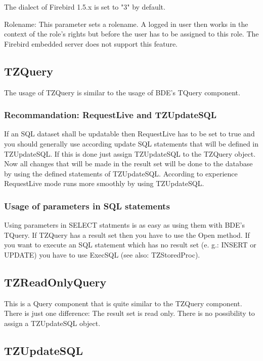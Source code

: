 \documentclass[a4paper,12pt,oneside]{book}
\begin{document}
The dialect of Firebird 1.5.x is set to "3" by default.

Rolename:
This parameter sets a rolename. A logged in user then works in the context of the role's rights but before the user has to be assigned to this role.
The Firebird embedded server does not support this feature.

\subsection{TZQuery}

The usage of TZQuery is similar to the usage of BDE's TQuery component.

\subsubsection{Recommandation: RequestLive and TZUpdateSQL}
If an SQL dataset shall be updatable then RequestLive has to be set to true and you should generally use according update SQL statements that will be defined in TZUpdateSQL.
If this is done just assign TZUpdateSQL to the TZQuery object.
Now all changes that will be made in the result set will be done to the database by using the defined statements of TZUpdateSQL.
According to experience RequestLive mode runs more smoothly by using TZUpdateSQL.

\subsubsection{Usage of parameters in SQL statements}

Using parameters in SELECT statments is as easy as using them with BDE's TQuery.
If TZQuery has a result set then you have to use the Open method.
If you want to execute an SQL statement which has no result set (e. g.: INSERT or UPDATE) you have to use ExecSQL (see also: TZStoredProc).

\subsection{TZReadOnlyQuery}

This is a Query component that is quite similar to the TZQuery component.
There is just one difference:
The result set is read only.
There is no possibility to assign a TZUpdateSQL object.

\subsection{TZUpdateSQL}
\end{document}
